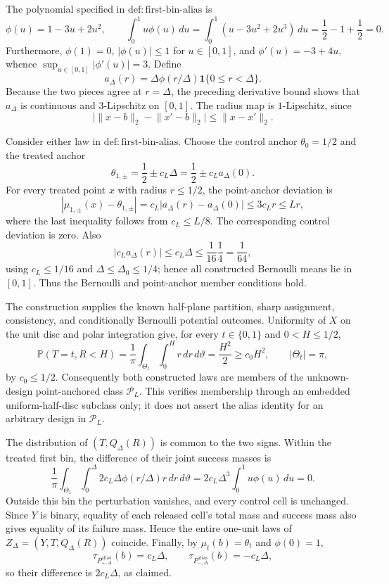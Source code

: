 The polynomial specified in \(\mathrm{def:first\text{-}bin\text{-}alias}\) is
\[
 \phi(u)=1-3u+2u^2,
 \qquad
 \int_0^1u\phi(u)\,du
 =\int_0^1(u-3u^2+2u^3)\,du
 =\frac12-1+\frac12=0.
\]
Furthermore, \(\phi(1)=0\), \(|\phi(u)|\leq1\) for \(u\in[0,1]\), and \(\phi'(u)=-3+4u\), whence \(\sup_{u\in[0,1]}|\phi'(u)|=3\).  Define
\[
 a_\Delta(r)=\Delta\phi(r/\Delta)\mathbf1\{0\leq r<\Delta\}.
\]
Because the two pieces agree at \(r=\Delta\), the preceding derivative bound shows that \(a_\Delta\) is continuous and \(3\)-Lipschitz on \([0,1]\).  The radius map is \(1\)-Lipschitz, since
\[
 \bigl|\lVert x-b\rVert_2-\lVert x'-b\rVert_2\bigr|
 \leq\lVert x-x'\rVert_2.
\]

Consider either law in \(\mathrm{def:first\text{-}bin\text{-}alias}\).  Choose the control anchor \(\theta_0=1/2\) and the treated anchor
\[
 \theta_{1,\pm}=\frac12\pm c_L\Delta
 =\frac12\pm c_La_\Delta(0).
\]
For every treated point \(x\) with radius \(r\leq1/2\), the point-anchor deviation is
\[
 |\mu_{1,\pm}(x)-\theta_{1,\pm}|
 =c_L|a_\Delta(r)-a_\Delta(0)|
 \leq3c_Lr\leq Lr,
\]
where the last inequality follows from \(c_L\leq L/8\).  The corresponding control deviation is zero.  Also
\[
 |c_La_\Delta(r)|\leq c_L\Delta
 \leq\frac1{16}\frac14=\frac1{64},
\]
using \(c_L\leq1/16\) and \(\Delta\leq\Delta_0\leq1/4\); hence all constructed Bernoulli means lie in \([0,1]\).  Thus the Bernoulli and point-anchor member conditions hold.

The construction supplies the known half-plane partition, sharp assignment, consistency, and conditionally Bernoulli potential outcomes.  Uniformity of \(X\) on the unit disc and polar integration give, for every \(t\in\{0,1\}\) and \(0<H\leq1/2\),
\[
 \mathbb P(T=t,R<H)
 =\frac1\pi\int_{\Theta_t}\int_0^H r\,dr\,d\vartheta
 =\frac{H^2}{2}
 \geq c_0H^2,
 \qquad |\Theta_t|=\pi,
\]
by \(c_0\leq1/2\).  Consequently both constructed laws are members of the unknown-design point-anchored class \(\mathcal P_L\).  This verifies membership through an embedded uniform-half-disc subclass only; it does not assert the alias identity for an arbitrary design in \(\mathcal P_L\).

The distribution of \((T,Q_\Delta(R))\) is common to the two signs.  Within the treated first bin, the difference of their joint success masses is
\[
 \frac1\pi\int_{\Theta_1}\int_0^\Delta
 2c_L\Delta\phi(r/\Delta)r\,dr\,d\vartheta
 =2c_L\Delta^3\int_0^1u\phi(u)\,du=0.
\]
Outside this bin the perturbation vanishes, and every control cell is unchanged.  Since \(Y\) is binary, equality of each released cell's total mass and success mass also gives equality of its failure mass.  Hence the entire one-unit laws of \(Z_\Delta=(Y,T,Q_\Delta(R))\) coincide.  Finally, by \(\mu_t(b)=\theta_t\) and \(\phi(0)=1\),
\[
 \tau_{P^{\mathrm{alias}}_{+,\Delta}}(b)=c_L\Delta,
 \qquad
 \tau_{P^{\mathrm{alias}}_{-,\Delta}}(b)=-c_L\Delta,
\]
so their difference is \(2c_L\Delta\), as claimed.